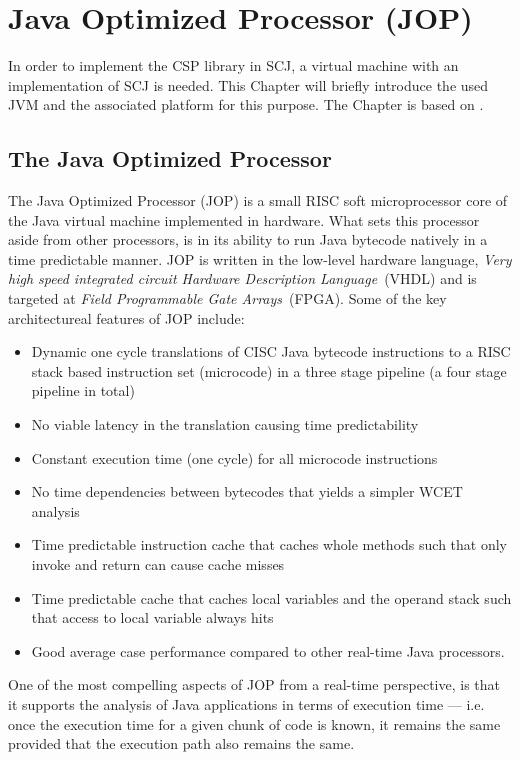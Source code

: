 \chapter{Java Optimized Processor (JOP)}
\label{chapter:jop}
In order to implement the CSP library in SCJ, a virtual machine with an implementation of SCJ is needed. This Chapter will briefly introduce the used JVM and the associated platform for this purpose. The Chapter is based on \cite{Schoeberl_ajava, JOPDesign, jop:handbook}.

\section{The Java Optimized Processor}
The Java Optimized Processor (JOP) is a small RISC soft microprocessor core of the Java virtual machine implemented in hardware. What sets this processor aside from other processors, is in its ability to run Java bytecode natively in a time predictable manner. JOP is written in the low-level hardware language, \textit{Very high speed integrated circuit Hardware Description Language}~(VHDL) and is targeted at \textit{Field Programmable Gate Arrays}~(FPGA). Some of the key architectureal features of JOP include:

\begin{itemize}
 	\item Dynamic one cycle translations of CISC Java bytecode instructions to a RISC stack based instruction set (microcode) in a three stage pipeline (a four stage pipeline in total)
 	\item No viable latency in the translation causing time predictability
 	\item Constant execution time (one cycle) for all microcode instructions
 	\item No time dependencies between bytecodes that yields a simpler WCET analysis
 	\item Time predictable instruction cache that caches whole methods such that only invoke and return can cause cache misses
 	\item Time predictable cache that caches local variables and the operand stack such that access to local variable always hits
 	\item Good average case performance compared to other real-time Java processors.
\end{itemize}
One of the most compelling aspects of JOP from a real-time perspective, is that it supports the analysis of Java applications in terms of execution time --- i.e. once the execution time for a given chunk of code is known, it remains the same provided that the execution path also remains the same. 

